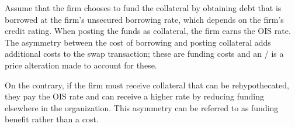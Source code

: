 \documentclass[main.tex]{subfiles}
\begin{document}
            Assume that the firm chooses to fund the collateral by obtaining debt
            that is borrowed at the firm's unsecured borrowing rate, which depends on the firm's credit rating.
            When posting the funds as collateral, the firm earns the OIS rate.
            The asymmetry between the cost of borrowing and posting collateral
            adds additional costs to the swap transaction; 
            these are funding costs and an \FVA/ is a price alteration made to account for these.

            On the contrary, if the firm must receive collateral that can be rehypothecated,
            they pay the OIS rate and can receive a higher rate
            by reducing funding elsewhere in the organization.
            This asymmetry can be referred to as funding benefit rather than a cost.
\end{document}
